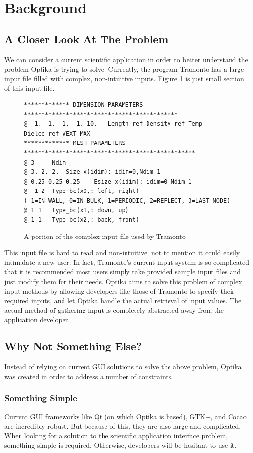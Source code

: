 \section{Background}
\subsection{A Closer Look At The Problem}
We can consider a current scientific application in order to better understand the problem Optika is trying to solve. 
Currently, the program Tramonto has a large input file filled with complex, non-intuitive inputs. Figure
\ref{tramontoInputFigure} is just small section of this input file.
\begin{figure}
  \centering
  {\footnotesize
  \begin{Verbatim}
************* DIMENSION PARAMETERS ********************************************
@ -1. -1. -1. -1. 10. 	Length_ref Density_ref Temp Dielec_ref VEXT_MAX 
************* MESH PARAMETERS *************************************************
@ 3 	Ndim 
@ 3. 2. 2. 	Size_x(idim): idim=0,Ndim-1 
@ 0.25 0.25 0.25 	Esize_x(idim): idim=0,Ndim-1 
@ -1 2 	Type_bc(x0,: left, right) 
(-1=IN_WALL, 0=IN_BULK, 1=PERIODIC, 2=REFLECT, 3=LAST_NODE) 
@ 1 1 	Type_bc(x1,: down, up) 
@ 1 1 	Type_bc(x2,: back, front) 
  \end{Verbatim}
  }
  \caption[Tramonto Input]{A portion of the complex input file used by Tramonto}
  \label{tramontoInputFigure}
\end{figure}

This input file is hard to read and non-intuitive, not to mention it could 
easily intimidate a new user. In fact, Tramonto's current input system is so complicated
that it is recommended most users simply take provided sample input files and just
modify them for their needs. Optika aims to solve this problem of complex input methods by allowing developers
like those of Tramonto to specify their required inputs, and let Optika handle the actual retrieval of
input values. The actual method of gathering input is completely abstracted away from the application developer.

\subsection{Why Not Something Else?}
Instead of relying on current GUI solutions to solve the above problem, Optika was created in order to address
a number of constraints.

\subsubsection{Something Simple}
Current GUI frameworks like Qt (on which Optika is based), GTK+, and Cocao are incredibly robust. But
because of this, they are also large and complicated. When looking for a solution to the 
scientific application interface problem, something simple is required. Otherwise, developers will be hesitant to use it.

